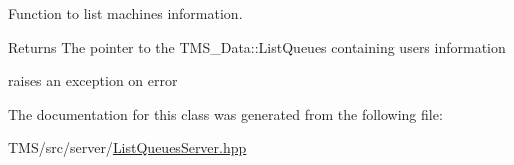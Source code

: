 Function to list machines information. 

\begin{DoxyReturn}{Returns}
The pointer to the TMS\_\-Data::ListQueues containing users information 

raises an exception on error 
\end{DoxyReturn}


The documentation for this class was generated from the following file:\begin{DoxyCompactItemize}
\item 
TMS/src/server/\hyperlink{ListQueuesServer_8hpp}{ListQueuesServer.hpp}\end{DoxyCompactItemize}
